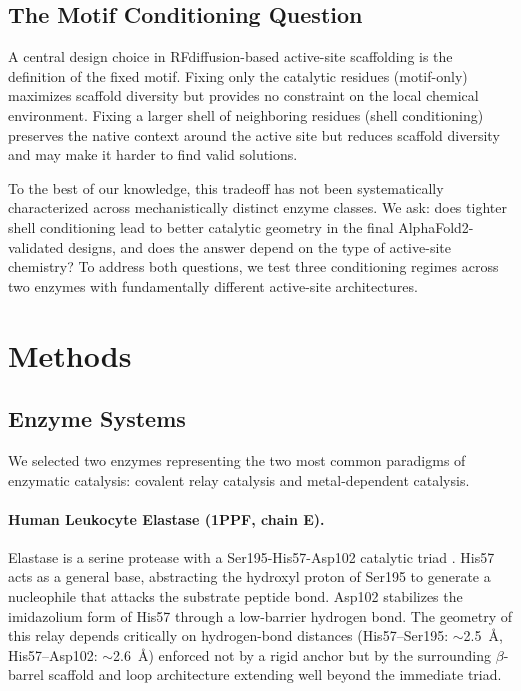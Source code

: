 \documentclass[11pt,letterpaper]{article}
\begin{document}
\subsection{The Motif Conditioning Question}

A central design choice in RFdiffusion-based active-site scaffolding is the definition of the fixed motif. Fixing only the catalytic residues (motif-only) maximizes scaffold diversity but provides no constraint on the local chemical environment. Fixing a larger shell of neighboring residues (shell conditioning) preserves the native context around the active site but reduces scaffold diversity and may make it harder to find valid solutions.

To the best of our knowledge, this tradeoff has not been systematically characterized across mechanistically distinct enzyme classes. We ask: does tighter shell conditioning lead to better catalytic geometry in the final AlphaFold2-validated designs, and does the answer depend on the type of active-site chemistry? To address both questions, we test three conditioning regimes across two enzymes with fundamentally different active-site architectures.

\section{Methods}

\subsection{Enzyme Systems}

We selected two enzymes representing the two most common paradigms of enzymatic catalysis: covalent relay catalysis and metal-dependent catalysis.

\paragraph{Human Leukocyte Elastase (1PPF, chain E).} Elastase is a serine protease with a Ser195-His57-Asp102 catalytic triad \cite{navia1989}. His57 acts as a general base, abstracting the hydroxyl proton of Ser195 to generate a nucleophile that attacks the substrate peptide bond. Asp102 stabilizes the imidazolium form of His57 through a low-barrier hydrogen bond. The geometry of this relay depends critically on hydrogen-bond distances (His57--Ser195: $\sim$2.5~\AA{}, His57--Asp102: $\sim$2.6~\AA{}) enforced not by a rigid anchor but by the surrounding $\beta$-barrel scaffold and loop architecture extending well beyond the immediate triad.
\end{document}
